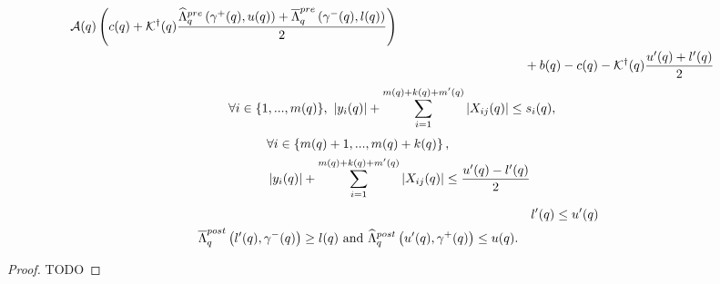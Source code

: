 \begin{lemma}
\begin{align}
\begin{split}
    \map(\loc)\lt(c(\loc)+\pinv{\ptemplate}(\loc)\frac{\minaffinefunc_{\loc}^{pre}\lt(\stay^+(\loc),u(\loc)\rt)
     +\maxaffinefunc_{\loc}^{pre}\lt(\stay^-(\loc),l(\loc)\rt)}{2}\rt)\\ & \hspace{10em} +
  b(\loc)-c(\loc)-\pinv{\ptemplate}(\loc)\frac{u^\pr(\loc)+l^\pr(\loc)}{2}
\end{split}
\end{align}
\begin{align}
\begin{split}
& \forall
i\in\{1,...,m(q)\},~\left|y_i(q)\right|+\sum_{i=1}^{m(q)+k(q)+m^\prime(q)}\left|X_{ij}(q)\right|\leq
s_i(q),
\end{split}
\end{align}
\begin{align}
\begin{split}
& \forall
i\in\left\{m(q)+1,...,m(q)+k(q)\right\},\\
&\left|y_i(q)\right|+\sum_{i=1}^{m(q)+k(q)+m^\prime(q)}\left|X_{ij}(q)\right|\leq
\frac{u^\prime(q)-l^\prime(q)}{2}
\end{split}
\end{align}
\begin{align}
& l^\prime(q)\leq u^\prime(q)\\
\begin{split}
& \overline{\Lambda}_{q}^{post}\left(l^\prime(q),\gamma^-(q)\right)\geq
l(q)~\text{and}~\widehat{\Lambda}_{q}^{post}\left(u^\prime(q),\gamma^+(q)\right)\leq u(q).
\end{split}
\end{align}
\end{lemma}
\begin{proof}
{\color{red} TODO}
\end{proof}


